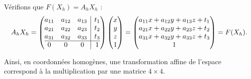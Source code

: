 \documentclass[11pt,class=report,crop=false]{standalone}
\begin{document}
Vérifions que $F(X_h) = A_h X_h$ :
$$A_h X_h = 
\left(\begin{array}{@{}ccc|c@{}}
	a_{11} & a_{12} & a_{13} & t_1 \\
	a_{21} & a_{22} & a_{23} & t_2 \\
	a_{31} & a_{32} & a_{33} & t_3 \\\hline
	0      & 0      & 0      & 1 \\
\end{array}\right)
\begin{pmatrix} x \\ y \\z \\ 1 \end{pmatrix}
= \begin{pmatrix} 
	a_{11}x + a_{12}y + a_{13}z + t_1 \\
	a_{21}x + a_{22}y + a_{23}z + t_2 \\
	a_{31}x + a_{32}y + a_{33}z + t_3 \\ 
	1 \end{pmatrix}
= F(X_h).$$


Ainsi, en coordonnées homogènes, une transformation affine de l'espace correspond à la multiplication par une matrice $4\times 4$.

\end{document}
